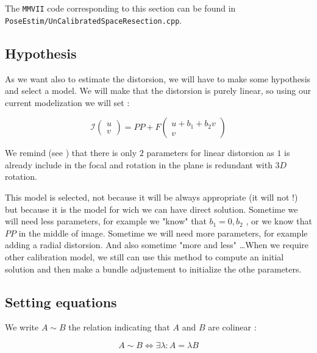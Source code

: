 The {\tt MMVII} code corresponding to this section can be found in 
{\tt PoseEstim/UnCalibratedSpaceResection.cpp}.

\subsection{Hypothesis}

As we want also to estimate the distorsion, we will have to make some hypothesis
and select a model.  We will make that the distorsion is purely linear, so using
our current modelization we will set :

\begin{equation}
	\mathcal{I}  \begin{pmatrix} u \\ v \end{pmatrix}  = PP + F \begin{pmatrix} u + b_1 + b_2 v \\ v \end{pmatrix} 
\end{equation}

We remind (see \RefFantome) that there is only $2$ parameters for linear distorsion as $1$ is already include in the focal
and rotation in the plane is redundant with $3D$ rotation. 

This model is selected, not because it will be always appropriate (it will not !) but because
it is the model  for wich we can have direct solution. Sometime we will need less parameters,
for example we "know" that $b_1=0,b_2$ , or we know that $PP$ in the middle of image. Sometime
we will need more parameters, for example adding a radial distorsion. And also sometime
"more and less" \dots When we require other calibration model, we still can use this method to compute
an initial solution and then make a bundle adjustement to initialize the othe parameters.


\subsection{Setting equations}

We write $A \sim B$ the relation indicating that $A$ and $B$ are colinear :

\begin{equation}
	  A \sim B   \Leftrightarrow  \exists \lambda : A =  \lambda B
\end{equation}

